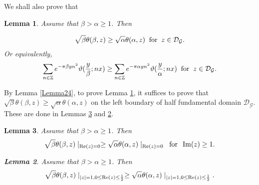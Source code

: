 \documentclass[reqno,english]{amsart}
\newtheorem{lemma}{Lemma}[section]
\newtheorem{open problem}{Open Problem}[section]
\newtheorem{open question}{Open Question}[section]
\newtheorem{open questions on hexagonal lattice}{Open Questions on hexagonal lattice}[section]
\renewcommand{\Re}{\operatorname{Re}}
\renewcommand{\Im}{\operatorname{Im}}
\begin{document}
We shall also prove that

\begin{lemma}\label{Lemma25} Assume that $\beta>\alpha\geq1$. Then

\begin{equation}\aligned\nonumber
\sqrt\beta\theta(\beta,z)\geq\sqrt\alpha\theta(\alpha,z)\;\;\hbox{for}\;\;z\in\mathcal{D}_{\mathcal{G}}.
\endaligned\end{equation}
Or equivalently,
\begin{equation}\aligned\label{CM}
\sum_{n\in\mathbb{Z}} e^{-\pi\beta yn^2}\vartheta(\frac{y}{\beta};nx)\geq
\sum_{n\in\mathbb{Z}} e^{-\pi\alpha yn^2}\vartheta(\frac{y}{\alpha};nx)\;\;\hbox{for}\;\;z\in\mathcal{D}_{\mathcal{G}}.
\endaligned\end{equation}

\end{lemma}

By Lemma \ref{Lemma24}, to prove Lemma \ref{Lemma25}, it suffices to prove that
$\sqrt\beta\theta(\beta,z)\geq\sqrt\alpha\theta(\alpha,z)$ on the left boundary of half fundamental domain $\mathcal{D}_{\mathcal{G}}$.
These are done in Lemmas \ref{Lemma26} and \ref{Lemma27}.

\begin{lemma}\label{Lemma26} Assume that $\beta>\alpha\geq1$. Then
\begin{equation}\aligned\nonumber
\sqrt\beta\theta(\beta,z)\mid_{\Re(z)=0}\geq\sqrt\alpha\theta(\alpha,z)\mid_{\Re(z)=0}\;\;\hbox{for}\;\;\Im(z)\geq1.
\endaligned\end{equation}


\begin{lemma}\label{Lemma27} Assume that $\beta>\alpha\geq1$. Then
\begin{equation}\aligned\nonumber
\sqrt\beta\theta(\beta,z)\mid_{|z|=1, 0\leq\Re(z)\leq\frac{1}{2}}\geq\sqrt\alpha\theta(\alpha,z)\mid_{|z|=1, 0\leq\Re(z)\leq\frac{1}{2}}.
\endaligned\end{equation}
\end{lemma}

\end{lemma}
\end{document}
